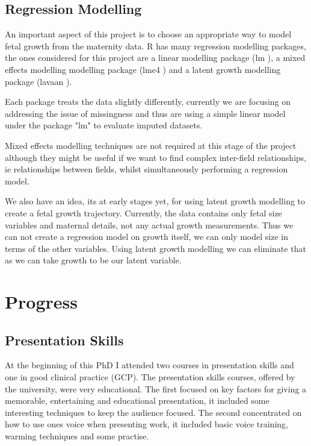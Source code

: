 \documentclass[bsc]{abdnthesis}
\begin{document}

\section{Regression Modelling} %
\label{sec:regression_modelling}
An important aspect of this project is to choose an appropriate way to model fetal growth from the maternity data. R has many regression modelling packages, the ones considered for this project are a linear modelling package (lm \cite{lm}), a mixed effects modelling modelling package (lme4 \cite{lme4}) and a latent growth modelling package (lavaan \cite{lavaan}). 

Each package treats the data slightly differently, currently we are focusing on addressing the issue of missingness and thus are using a simple linear model under the package "lm" to evaluate imputed datasets. 

Mixed effects modelling techniques are not required at this stage of the project although they might be useful if we want to find complex inter-field relationships, ie relationships between fields, whilst simultaneously performing a regression model. 

We also have an idea, its at early stages yet, for using latent growth modelling to create a fetal growth trajectory. Currently, the data contains only fetal size variables and maternal details, not any actual growth measurements. Thus we can not create a regression model on growth itself, we can only model size in terms of the other variables. Using latent growth modelling we can eliminate that as we can take growth to be our latent variable. 


\chapter{Progress}
\section{Presentation Skills} %
\label{sec:presentation_skills}
At the beginning of this PhD I attended two courses in presentation skills and one in good clinical practice (GCP). The presentation skills courses, offered by the university, were very educational. The first focused on key factors for giving a memorable, entertaining and educational presentation, it included some interesting techniques to keep the audience focused. The second concentrated on how to use ones voice when presenting work, it included basic voice training, warming techniques and some practise. 
\end{document}
